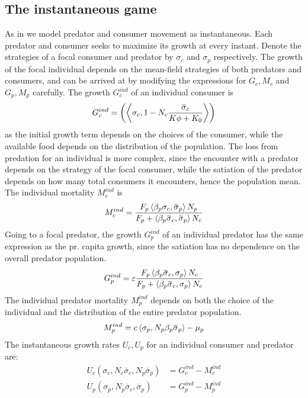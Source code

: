 \subsection{The instantaneous game}
As in  we model predator and consumer movement as instantaneous. Each predator and consumer seeks to maximize its growth at every instant. Denote the strategies of a focal consumer and predator by $\sigma_c$ and $\sigma_p$ respectively.  The growth of the focal individual depends on the mean-field strategies of both predators and consumers, and can be arrived at by modifying the expressions for $G_c,M_c$ and $G_p, M_p$ carefully.
The growth $G_c^{ind}$ of an individual consumer is
\begin{equation}
  G_c^{ind} = \pa{\ip{\sigma_c}{1-N_c \frac{\overbar{\sigma}_c}{K\phi + K_0}}}
\end{equation}
as the initial growth term depends on the choices of the consumer, while the available food depends on the distribution of the population. The loss from predation for an individual is more complex, since the encounter with a predator depends on the strategy of the focal consumer, while the satiation of the predator depends on how many total consumers it encounters, hence the population mean. The individual mortality $M_c^{ind}$ is
\begin{equation}
  M_c^{ind} =  \frac{F_p \ip{\beta_p \sigma_c}{\overbar{\sigma}_p} N_p}{F_p + \ip{\beta_p \overbar{\sigma}_c}{\overbar{\sigma}_p} N_c}
\end{equation}
Going to a focal predator, the growth $G_p^{ind}$ of an individual predator has the same expression as the pr. capita growth, since the satiation has no dependence on the overall predator population.
\begin{equation}
  G_p^{ind} = \epsilon \frac{F_p \ip{\beta_p \overbar{\sigma}_c}{\sigma_p} N_c}{F_p + \ip{\beta_p \overbar{\sigma}_c}{\sigma_p} N_c}
\end{equation}
The individual predator mortality $M_p^{ind}$ depends on both the choice of the individual and the distribution of the entire predator population.
\begin{equation}
  M_p^{ind} =  c \ip{\sigma_p}{N_p\beta_p \overbar{\sigma}_p}  - \mu_p
\end{equation}
The instantaneous growth rates $U_c,U_p$ for an individual consumer and predator are:
\begin{align}
  U_c(\sigma_c, N_c \overbar{\sigma}_c, N_p\overbar{\sigma}_p) &=  G_c^{ind} - M_c^{ind} \\
  U_p(\sigma_p, N_p \overbar{\sigma}_c, \overbar{\sigma}_p) &= G_p^{ind} - M_p^{ind}
\end{align}
